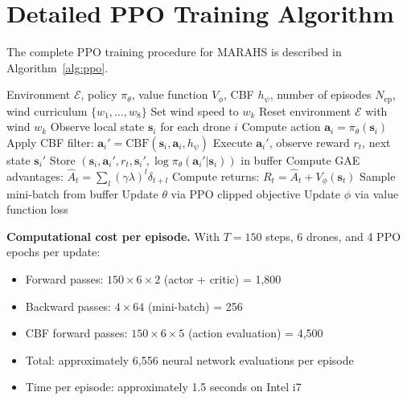\documentclass[12pt,a4paper]{article}
\DeclareRobustCommand{\cE}{\mathcal{E}}
\DeclareRobustCommand{\vect}[1]{\bm{#1}}
\begin{document}
\section{Detailed PPO Training Algorithm}
\label{app:ppo_training}

The complete PPO training procedure for MARAHS is described in Algorithm~\ref{alg:ppo}.

\begin{algorithm}[t]
\caption{PPO Training for MARAHS with CBF Safety Layer}
\label{alg:ppo}
\begin{algorithmic}[1]
\Require Environment $\cE$, policy $\pi_\theta$, value function $V_\phi$, CBF $h_\psi$, number of episodes $N_{\text{ep}}$, wind curriculum $\{w_1, \ldots, w_8\}$
 
    \State Set wind speed to $w_k$
        \State Reset environment $\cE$ with wind $w_k$
            \State Observe local state $\vect{s}_i$ for each drone $i$
            \State Compute action $\vect{a}_i = \pi_\theta(\vect{s}_i)$
            \State Apply CBF filter: $\vect{a}_i' = \text{CBF}(\vect{s}_i, \vect{a}_i, h_\psi)$
            \State Execute $\vect{a}_i'$, observe reward $r_t$, next state $\vect{s}_i'$
            \State Store $(\vect{s}_i, \vect{a}_i', r_t, \vect{s}_i', \log \pi_\theta(\vect{a}_i'|\vect{s}_i))$ in buffer
        \EndFor
        \State Compute GAE advantages: $\hat{A}_t = \sum_l (\gamma\lambda)^l \delta_{t+l}$
        \State Compute returns: $R_t = \hat{A}_t + V_\phi(\vect{s}_t)$
            \State Sample mini-batch from buffer
            \State Update $\theta$ via PPO clipped objective
            \State Update $\phi$ via value function loss
        \EndFor
    \EndFor
\EndFor
\end{algorithmic}
\end{algorithm}

\textbf{Computational cost per episode.} With $T = 150$ steps, 6 drones, and 4 PPO epochs per update:
\begin{itemize}[leftmargin=*]
    \item Forward passes: $150 \times 6 \times 2$ (actor + critic) = 1,800
    \item Backward passes: $4 \times 64$ (mini-batch) = 256
    \item CBF forward passes: $150 \times 6 \times 5$ (action evaluation) = 4,500
    \item Total: approximately 6,556 neural network evaluations per episode
    \item Time per episode: approximately 1.5 seconds on Intel i7
\end{itemize}
\end{document}
